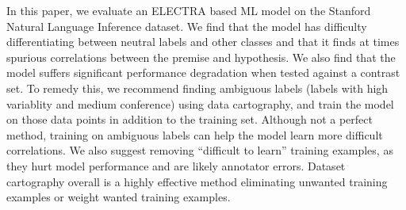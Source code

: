 \documentclass[twocolumn]{article}
\begin{document}
In this paper, we evaluate an ELECTRA based ML model on the Stanford Natural
Language Inference dataset. We find that the model has difficulty
differentiating between neutral labels and other classes and that it finds at
times spurious correlations between the premise and hypothesis. We also find
that the model suffers significant performance degradation when tested against a
contrast set. To remedy this, we recommend finding ambiguous labels (labels with
high variablity and medium conference) using data cartography, and train the
model on those data points in addition to the training set. Although not a
perfect method, training on ambiguous labels can help the model learn more
difficult correlations. We also suggest removing \enquote{difficult to learn}
training examples, as they hurt model performance and are likely annotator
errors. Dataset cartography overall is a highly effective method eliminating
unwanted training examples or weight wanted training examples.

{}

\end{document}
